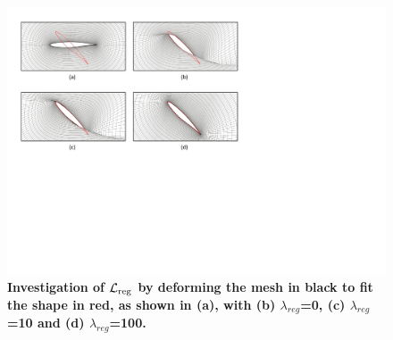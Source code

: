\begin{figure}[ht]
    \begin{center}
        \includegraphics[width=1\linewidth]{chapter5/fig/journal_ablation_studies_w_loss_reg.pdf} 
    \end{center}
    \caption{
        \small \textbf{ Investigation of $\mathcal{L}_{\rm reg}$ by deforming the mesh in black to fit the shape in red, as shown in (a), with (b) $\lambda_{reg}$=0, (c) $\lambda_{reg}$=10 and (d) $\lambda_{reg}$=100.}
    }
    \label{ch5:fig:w_loss_reg_ablation}
\end{figure}


\iffalse


